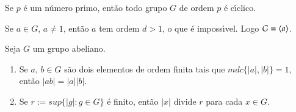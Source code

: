 \begin{corolario}
	Se $p$ \'e um n\'umero primo, ent\~ao todo grupo $G$ de ordem $p$ \'e c{\'\i}clico.
\end{corolario}
\begin{prova}
	Se $a \in G$, $a \ne 1$, ent\~ao $a$ tem ordem $d > 1$, o que \'e imposs{\'\i}vel. Logo $G = \langle{a}\rangle$.
\end{prova}

\begin{proposicao}
	Seja $G$ um grupo abeliano.
	\begin{enumerate}[label=({\roman*})]
		\item Se $a$, $b \in G$ s\~ao dois elementos de ordem finita tais que $mdc\{|a|, |b|\} = 1$, ent\~ao $|ab| = |a||b|$.
		\item Se $r:= sup\{|g| : g \in G\}$ \'e finito, ent\~ao $|x|$ divide $r$ para cada $x \in G$.
	\end{enumerate}
\end{proposicao}
